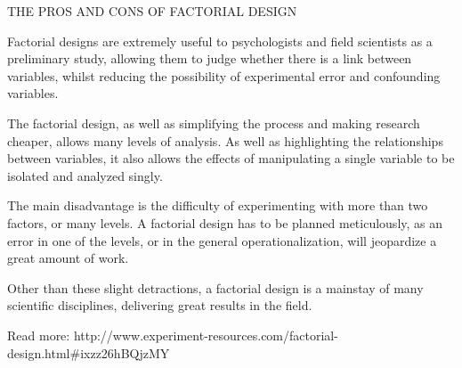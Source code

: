 
THE PROS AND CONS OF FACTORIAL DESIGN

Factorial designs are extremely useful to psychologists and field scientists as a preliminary study, allowing them to judge whether there is a link between variables, whilst reducing the possibility of experimental error and confounding variables.

The factorial design, as well as simplifying the process and making research cheaper, allows many levels of analysis. As well as highlighting the relationships between variables, it also allows the effects of manipulating a single variable to be isolated and analyzed singly.

The main disadvantage is the difficulty of experimenting with more than two factors, or many levels. A factorial design has to be planned meticulously, as an error in one of the levels, or in the general operationalization, will jeopardize a great amount of work.

Other than these slight detractions, a factorial design is a mainstay of many scientific disciplines, delivering great results in the field.



Read more: http://www.experiment-resources.com/factorial-design.html#ixzz26hBQjzMY

